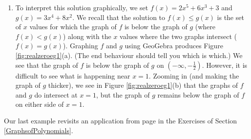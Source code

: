 {\begin{enumerate}
\item To interpret this solution graphically, we set $f(x) = 2x^5+6x^3+3$ and $g(x) = 3x^4+8x^2$.  We recall that the solution to $f(x) \leq g(x)$ is the set of $x$ values for which the graph of $f$ is below the graph of $g$ (where $f(x) < g(x)$) along with the $x$ values where the two graphs intersect ($f(x) = g(x)$).  Graphing $f$ and $g$ using GeoGebra produces Figure \ref{fig:realzeroeg1}(a).  (The end behaviour should tell you which is which.)  We see that the graph of $f$ is below the graph of $g$ on $\left(-\infty, -\frac{1}{2}\right)$. However, it is difficult to see what is happening near $x=1$.  Zooming in (and making the graph of $g$ thicker), we see in Figure \ref{fig:realzeroeg1}(b) that the graphs of $f$ and $g$ do intersect at $x=1$, but the graph of $g$ remains below the graph of $f$ on either side of $x = 1$.

\end{enumerate}
}


\medskip

Our last example revisits an application from page \pageref{LCDmaxprofit} in the Exercises of Section \ref{GraphsofPolynomials}.

\medskip


